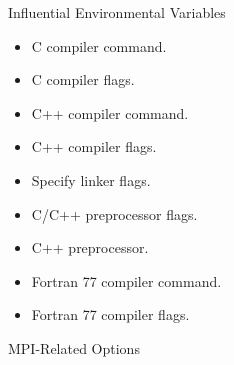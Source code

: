 \documentclass[12pt,relax]{TrilinosDevGuide}
\begin{document}
 Influential Environmental Variables

\begin{itemize}
\item {}

C compiler command.

\item {}

C compiler flags.

\item {}

C++ compiler command.

\item {}

C++ compiler flags.

\item {}

Specify linker flags.

\item {}

C/C++ preprocessor flags.

\item {}

C++ preprocessor.

\item {}

Fortran 77 compiler command.

\item {}

Fortran 77 compiler flags.
\end{itemize}

MPI-Related Options
\end{document}
